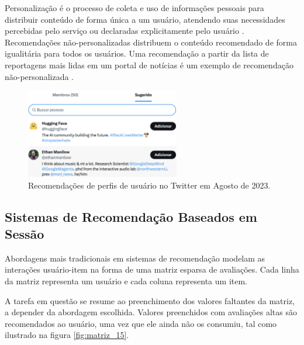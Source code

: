 Personalização é o processo de coleta e uso de informações pessoais para
distribuir conteúdo de forma única a um usuário, atendendo suas necessidades
percebidas pelo serviço ou declaradas explicitamente pelo usuário
\cite{liang2006personalized}. Recomendações não-personalizadas distribuem o
conteúdo recomendado de forma igualitária para todos os usuários. Uma
recomendação a partir da lista de reportagens mais lidas em um portal de
notícias é um exemplo de recomendação não-personalizada
\cite{falk2019practical}.



\begin{figure}[ht]
    \centering
    \includegraphics[width=0.6\textwidth]{chapters/chap01/images/tt.png}
    \caption{Recomendações de perfis de usuário no Twitter em Agosto de 2023.}
    \label{fig:twitter}
\end{figure}

\subsection{Sistemas de Recomendação Baseados em Sessão}

Abordagens mais tradicionais em sistemas de recomendação modelam as interações
usuário-item na forma de uma matriz esparsa de avaliações. Cada linha da matriz
representa um usuário e cada coluna representa um item.

A tarefa em questão se
resume ao preenchimento dos valores faltantes da matriz, a depender da
abordagem escolhida. Valores preenchidos com avaliações altas são recomendados
ao usuário, uma vez que ele ainda não os consumiu, tal como ilustrado
na figura \ref{fig:matriz_15}.


